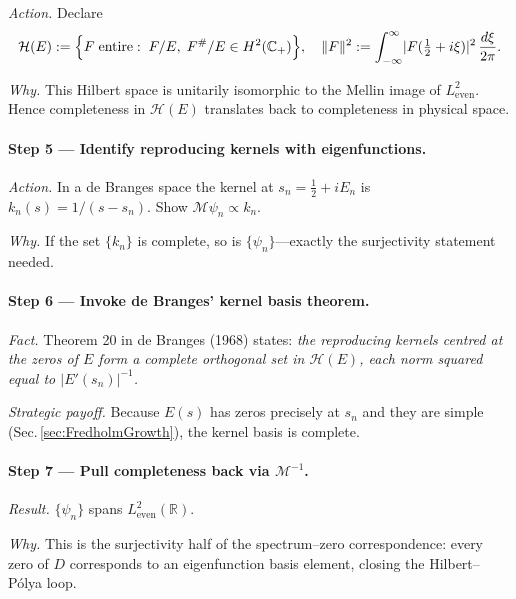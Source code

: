 \documentclass[11pt]{article}
\begin{document}
\emph{Action.}  
Declare  
\[
   \mathcal H(E)
   :=\Bigl\{
          F\;\text{entire}:\;
          F/E,\;F^{\#}/E\in H^{2}(\mathbb C_{+})
     \Bigr\},
   \quad
   \|F\|^{2}:=\int_{-\infty}^{\infty}\!
                |F(\tfrac12+i\xi)|^{2}\,\frac{d\xi}{2\pi}.
\]

\emph{Why.}  
This Hilbert space is unitarily isomorphic to the Mellin image of
\(L^{2}_{\mathrm{even}}\).  
Hence completeness in \(\mathcal H(E)\) translates back to completeness
in physical space.

\vspace{0.4em}
\paragraph{Step 5 — Identify reproducing kernels with eigenfunctions.}

\emph{Action.}  
In a de Branges space the kernel at \(s_{n}=\tfrac12+iE_{n}\) is  
\(k_{n}(s)=1/(s-s_{n})\).  
Show \(\mathcal M\psi_{n}\propto k_{n}\).

\emph{Why.}  
If the set \(\{k_{n}\}\) is complete, so is
\(\{\psi_{n}\}\)—exactly the surjectivity statement needed.

\vspace{0.4em}
\paragraph{Step 6 — Invoke de Branges’ kernel basis theorem.}

\emph{Fact.}  
Theorem 20 in de Branges (1968) states:
\emph{the reproducing kernels centred at the zeros of $E$ form a
complete orthogonal set in $\mathcal H(E)$, each norm squared equal to
$|E'(s_{n})|^{-1}$.}

\emph{Strategic payoff.}  
Because $E(s)$ has zeros precisely at $s_{n}$ and they are simple
(Sec.\,\ref{sec:FredholmGrowth}), the kernel basis is complete.

\vspace{0.4em}
\paragraph{Step 7 — Pull completeness back via $\mathcal M^{-1}$.}

\emph{Result.}  
\(\{\psi_{n}\}\) spans \(L^{2}_{\mathrm{even}}(\mathbb R)\).

\emph{Why.}  
This is the surjectivity half of the spectrum–zero correspondence:
every zero of $D$ corresponds to an eigenfunction basis element,
closing the Hilbert–Pólya loop.
\end{document}
